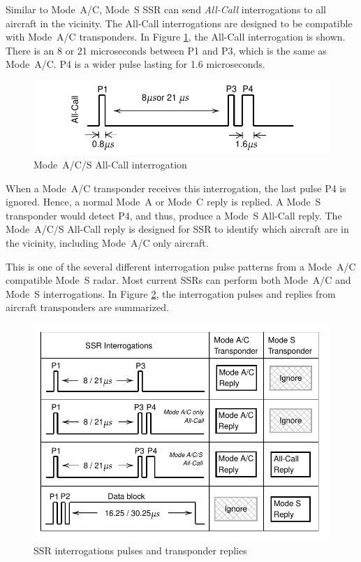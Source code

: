 Similar to Mode~A/C, Mode~S SSR can send \emph{All-Call} interrogations to all aircraft in the vicinity. The All-Call interrogations are designed to be compatible with Mode~A/C transponders. In Figure \ref{fig:mode_s_all_call}, the All-Call interrogation is shown. There is an 8 or 21 microseconds between P1 and P3, which is the same as Mode~A/C. P4 is a wider pulse lasting for 1.6 microseconds.

\begin{figure}[ht]
  \includegraphics[scale=0.8]{figures/intro/mode_acs_all_call.pdf}
  \caption{Mode~A/C/S All-Call interrogation}
  \label{fig:mode_s_all_call}
\end{figure}

When a Mode~A/C transponder receives this interrogation, the last pulse P4 is ignored. Hence, a normal Mode~A or Mode~C reply is replied. A Mode~S transponder would detect P4, and thus, produce a Mode~S All-Call reply. The Mode~A/C/S All-Call reply is designed for SSR to identify which aircraft are in the vicinity, including Mode~A/C only aircraft.

This is one of the several different interrogation pulse patterns from a Mode~A/C compatible Mode~S radar. Most current SSRs can perform both Mode~A/C and Mode~S interrogations. In Figure \ref{fig:mode_s_inter_mode}, the interrogation pulses and replies from aircraft transponders are summarized.

\begin{figure}[ht]
  \includegraphics[scale=0.8]{figures/intro/mode_s_inter_mode.pdf}
  \caption{SSR interrogations pulses and transponder replies}
  \label{fig:mode_s_inter_mode}
\end{figure}

